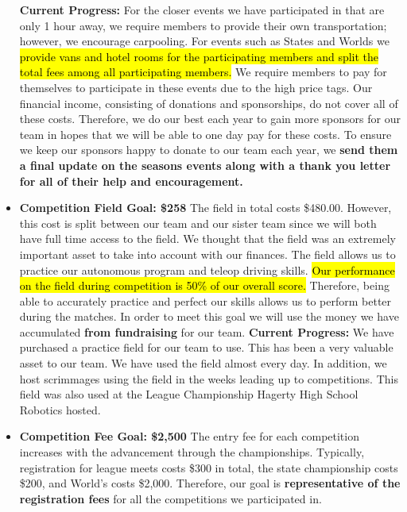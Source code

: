 \begin{itemize}
  \textbf{Current Progress: }
  For the closer events we have participated in that are only 1 hour away, we require members to provide their own transportation; however, we encourage carpooling. For events such as States and Worlds we \hl{provide vans and hotel rooms for the participating members and split the total fees among all participating members.} We require members to pay for themselves to participate in these events due to the high price tags. Our financial income, consisting of donations and sponsorships, do not cover all of these costs. Therefore, we do our best each year to gain more sponsors for our team in hopes that we will be able to one day pay for these costs. To ensure we keep our sponsors happy to donate to our team each year, we \textbf{send them a final update on the seasons events along with a thank you letter for all of their help and encouragement.} 
  \item \textbf{\Large Competition Field Goal: \$258}
  \newline 
   The field in total costs \$480.00. However, this cost is split between our team and our sister team since we will both have full time access to the field. We thought that the field was an extremely important asset to take into account with our finances. The field allows us to practice our autonomous program and teleop driving skills. \hl{Our performance on the field during competition is 50\% of our overall score.} Therefore, being able to accurately practice and perfect our skills allows us to perform better during the matches. In order to meet this goal we will use the money we have accumulated \textbf{from fundraising} for our team.
  \newline 
\textbf{Current Progress:} We have purchased a practice field for our team to use. This has been a very valuable asset to our team. We have used the field almost every day. In addition, we host scrimmages using the field in the weeks leading up to competitions. This field was also used at the League Championship Hagerty High School Robotics hosted. 
  \item \textbf{\Large Competition Fee Goal: \$2,500}
  \newline 
  The entry fee for each competition increases with the advancement through the championships. Typically, registration for league meets costs \$300 in total, the state championship costs \$200, and World's costs \$2,000. Therefore, our goal is \textbf{representative of the registration fees} for all the competitions we participated in.
  

\end{itemize}
